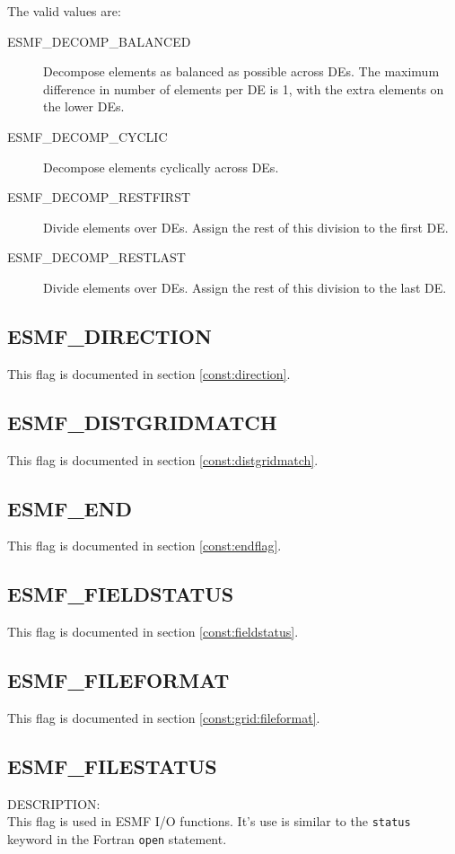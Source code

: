 The valid values are:
\begin{description}
\item [ESMF\_DECOMP\_BALANCED]
      Decompose elements as balanced as possible across DEs. The maximum 
      difference in number of elements per DE is 1, with the extra elements on
      the lower DEs.
\item [ESMF\_DECOMP\_CYCLIC]
      Decompose elements cyclically across DEs.
\item [ESMF\_DECOMP\_RESTFIRST]
      Divide elements over DEs. Assign the rest of this division to the first
      DE.
\item [ESMF\_DECOMP\_RESTLAST]
      Divide elements over DEs. Assign the rest of this division to the last DE.
\end{description}

\subsection{ESMF\_DIRECTION}
This flag is documented in section \ref{const:direction}.

\subsection{ESMF\_DISTGRIDMATCH}
This flag is documented in section \ref{const:distgridmatch}.

\subsection{ESMF\_END}

This flag is documented in section \ref{const:endflag}.

\subsection{ESMF\_FIELDSTATUS}
This flag is documented in section \ref{const:fieldstatus}.

\subsection{ESMF\_FILEFORMAT}
This flag is documented in section \ref{const:grid:fileformat}.

\subsection{ESMF\_FILESTATUS}
\label{const:filestatusflag}
{\sf DESCRIPTION:\\}
This flag is used in ESMF I/O functions. It's use is similar to the
{\tt status} keyword in the Fortran {\tt open} statement.

